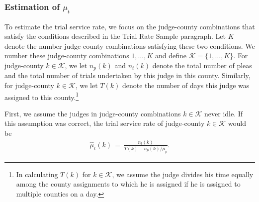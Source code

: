 \documentclass[11pt, oneside]{article}   	%
\theoremstyle{ModifiedStyle}
\begin{document}
		\subsubsection{Estimation of $\mu_t$}
			\label{mu_t-estimation}
			To estimate the trial service rate, we focus on the judge-county combinations that satisfy the conditions described in the Trial Rate Sample paragraph. Let $K$ denote the number judge-county combinations satisfying these two conditions. We number these judge-county combinations $1,\ldots,K$ and define $\mathcal{K} = \{1,\ldots,K\}$. For judge-county $k \in \mathcal{K}$, we let $n_p(k)$ and $n_t(k)$ denote the total number of pleas and the total number of trials undertaken by this judge in this county. Similarly, for judge-county $k \in \mathcal{K}$, we let $T(k)$ denote the number of days this judge was assigned to this county.\footnote{In calculating $T(k)$ for $k\in\mathcal{K}$, we assume the judge divides his time equally among the county assignments to which he is assigned if he is assigned to multiple counties on a day.}

			First, we assume the judges in judge-county combinations $k\in\mathcal{K}$ never idle. If this assumption was correct, the trial service rate of judge-county $k\in\mathcal{K}$ would be
			\begin{align*}
				\hat{\mu}_t(k) \,=\, \frac{n_t(k)}{T(k) - n_p(k) / \hat{\mu}_p}.
			\end{align*}
\end{document}
